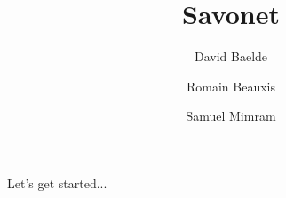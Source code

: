 \documentclass{llncs}
\title{Savonet}
\author{David Baelde \and Romain Beauxis \and Samuel Mimram}
\begin{document}
\maketitle

Let's get started...
\end{document}
